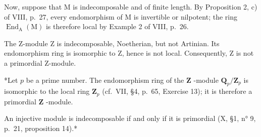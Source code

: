 Now, suppose that M is indecomposable and of finite length. By Proposition 2, c) of VIII, p.~27, every endomorphism of M is invertible or nilpotent; the ring \(\operatorname{End}_{\mathrm{A}}(\mathrm{M})\) is therefore local by Example 2 of VIII, p.~26.

The Z-module Z is indecomposable, Noetherian, but not Artinian. Its endomorphism ring is isomorphic to Z, hence is not local. Consequently, Z is not a primordial Z-module.

*Let \(p\) be a prime number. The endomorphism ring of the \(\mathbf{Z}\) -module \(\mathbf{Q}_p / \mathbf{Z}_p\) is isomorphic to the local ring \(\mathbf{Z}_p\) (cf.~VII, §4, p.~65, Exercise 13); it is therefore a primordial \(\mathbf{Z}\) -module.

An injective module is indecomposable if and only if it is primordial (X, §1, n° 9, p.~21, proposition 14).*

